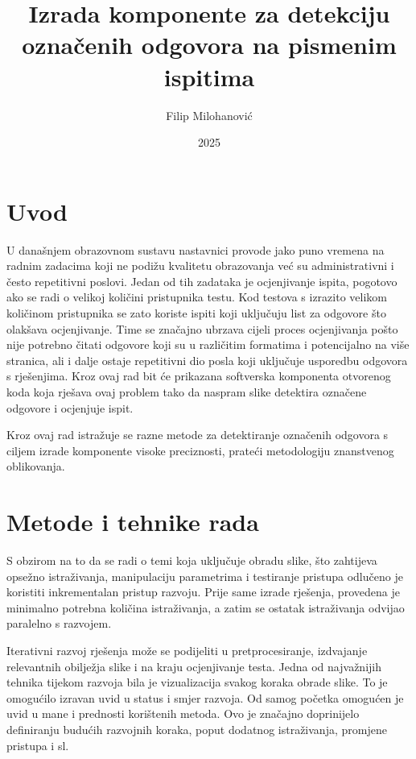 \documentclass{foi}
\title{Izrada komponente za detekciju označenih odgovora na pismenim ispitima}
\author{Filip Milohanović}
\date{2025}
\begin{document}
\maketitle

\tableofcontents

\pagestyle{plain}
\chapter{Uvod}

U današnjem obrazovnom sustavu nastavnici provode jako puno vremena na radnim zadacima koji ne podižu kvalitetu obrazovanja već su administrativni i često repetitivni poslovi. Jedan od tih zadataka je ocjenjivanje ispita, pogotovo ako se radi o velikoj količini pristupnika testu. Kod testova s izrazito velikom količinom pristupnika se zato koriste ispiti koji uključuju list za odgovore što olakšava ocjenjivanje. Time se značajno ubrzava cijeli proces ocjenjivanja pošto nije potrebno čitati odgovore koji su u različitim formatima i potencijalno na više stranica, ali i dalje ostaje repetitivni dio posla koji uključuje usporedbu odgovora s rješenjima. Kroz ovaj rad bit će prikazana softverska komponenta otvorenog koda koja rješava ovaj problem tako da naspram slike detektira označene odgovore i ocjenjuje ispit.

Kroz ovaj rad istražuje se razne metode za detektiranje označenih odgovora s ciljem izrade komponente visoke preciznosti, prateći metodologiju znanstvenog oblikovanja.

\chapter{Metode i tehnike rada}

S obzirom na to da se radi o temi koja uključuje obradu slike, što zahtijeva opsežno istraživanja, manipulaciju parametrima i testiranje pristupa odlučeno je koristiti inkrementalan pristup razvoju. Prije same izrade rješenja, provedena je minimalno potrebna količina istraživanja, a zatim se ostatak istraživanja odvijao paralelno s razvojem.

Iterativni razvoj rješenja može se podijeliti u pretprocesiranje, izdvajanje relevantnih obilježja slike i na kraju ocjenjivanje testa. Jedna od najvažnijih tehnika tijekom razvoja bila je  vizualizacija svakog koraka obrade slike. To je omogućilo izravan uvid u status i smjer razvoja. Od samog početka omogućen je uvid u mane i prednosti korištenih metoda. Ovo je značajno doprinijelo definiranju budućih razvojnih koraka, poput  dodatnog istraživanja, promjene pristupa i sl. 
\end{document}
